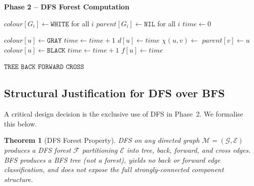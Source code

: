 ﻿\documentclass[12pt,a4paper]{article}
\theoremstyle{plain}
\newtheorem{theorem}{Theorem}[section]
\theoremstyle{definition}
\theoremstyle{remark}
\begin{document}
	\begin{algorithm}[H]
		\ContinuedFloat
		\caption{HS-DFS (continued)}
		\begin{algorithmic}[1]
			\Statex \hrulefill
			\Statex \textbf{Phase 2 -- DFS Forest Computation}
			\Statex \hrulefill
			
			\State $\mathit{colour}[G_i] \leftarrow \mathtt{WHITE}$ for all $i$
			\State $\mathit{parent}[G_i] \leftarrow \mathtt{NIL}$ for all $i$
			\State $\mathit{time} \leftarrow 0$
			
			\State {}
			\EndIf
			\EndFor
			
			\Statex
			\State $\mathit{colour}[u] \leftarrow \mathtt{GRAY}$
			\State $\mathit{time} \leftarrow \mathit{time} + 1$
			\State $d[u] \leftarrow \mathit{time}$
			\State $\chi(u,v) \leftarrow$ 
			\State $\mathit{parent}[v] \leftarrow u$
			\State {}
			\EndIf
			\EndFor
			\State $\mathit{colour}[u] \leftarrow \mathtt{BLACK}$
			\State $\mathit{time} \leftarrow \mathit{time} + 1$
			\State $f[u] \leftarrow \mathit{time}$
			\EndProcedure
			
			\Statex
			\Return $\mathtt{TREE}$
			\Return $\mathtt{BACK}$
			\Return $\mathtt{FORWARD}$
			\Else
			\Return $\mathtt{CROSS}$
			\EndIf
			\EndFunction
			
		\end{algorithmic}
	\end{algorithm}
	
	\subsection{Structural Justification for DFS over BFS}
	
	A critical design decision is the exclusive use of DFS in Phase~2.
	We formalise this below.
	
	\begin{theorem}[DFS Forest Property]
		\label{thm:dfsforest}
		DFS on any directed graph $\mathcal{M} = (\mathcal{G}, \mathcal{E})$
		produces a \emph{DFS forest} $\mathcal{F}$ partitioning $\mathcal{E}$
		into tree, back, forward, and cross edges.  BFS produces a \emph{BFS tree}
		(not a forest), yields no back or forward edge classification, and
		does not expose the full strongly-connected component structure.
	\end{theorem}
	
\end{document}
